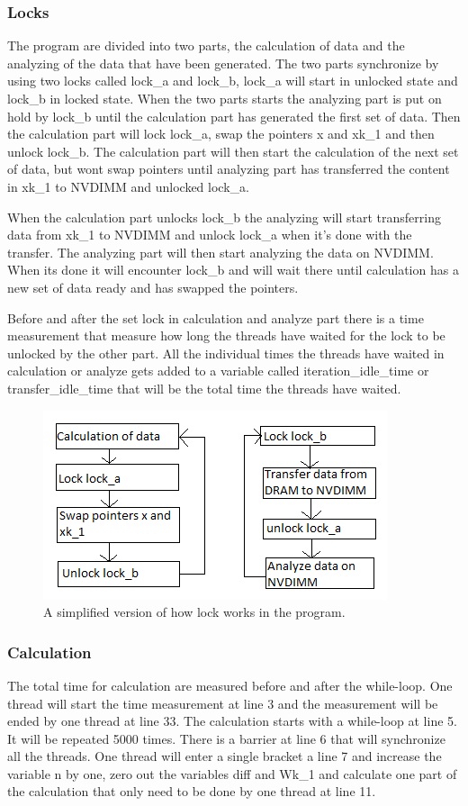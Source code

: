 \documentclass[12pt,a4paper,USenglish]{article}      %
\begin{document}
\subsubsection{Locks}
The program are divided into two parts, the calculation of data and the analyzing of the data that have been generated. The two parts synchronize by using two locks called lock\_a and lock\_b, lock\_a will start in unlocked state and lock\_b in locked state. When the two parts starts the analyzing part is put on hold by lock\_b until the calculation part has generated the first set of data. Then the calculation part will lock lock\_a, swap the pointers x and xk\_1 and then unlock lock\_b. The calculation part will then start the calculation of the next set of data, but wont swap pointers until analyzing part has transferred the content in xk\_1 to NVDIMM and unlocked lock\_a.

When the calculation part unlocks lock\_b the analyzing will start transferring data from xk\_1 to NVDIMM and unlock lock\_a when it's done with the transfer. The analyzing part will then start analyzing the data on NVDIMM. When its done it will encounter lock\_b and will wait there until calculation has a new set of data ready and has swapped the pointers.

Before and after the set lock in calculation and analyze part there is a time measurement that measure how long the threads have waited for the lock to be unlocked by the other part. All the individual times the threads have waited in calculation or analyze gets added to a variable called iteration\_idle\_time or transfer\_idle\_time that will be the total time the threads have waited. 

\begin{figure}[!hbtp]
\includegraphics[scale=1]{lock_overview.png}
\caption{A simplified version of how lock works in the program.}
\end{figure}

\subsubsection{Calculation}
The total time for calculation are measured before and after the while-loop. One thread will start the time measurement at line 3 and the measurement will be ended by one thread at line 33.
The calculation starts with a while-loop at line 5. It will be repeated 5000 times. There is a barrier at line 6 that will synchronize all the threads. One thread will enter a single bracket a line 7 and increase the variable n by one, zero out the variables diff and Wk\_1 and calculate one part of the calculation that only need to be done by one thread at line 11.
\end{document}

